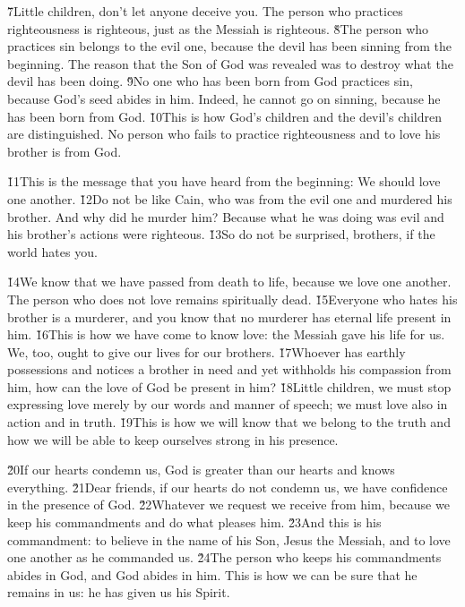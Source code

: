 \v{7}Little children, don't let anyone deceive you. The person who practices righteousness is righteous, just as the Messiah is righteous. \v{8}The person who practices sin belongs to the evil one, because the devil has been sinning from the beginning. The reason that the Son of God was revealed was to destroy what the devil has been doing. \v{9}No one who has been born from God practices sin, because God's seed abides in him. Indeed, he cannot go on sinning, because he has been born from God. \v{10}This is how God's children and the devil's children are distinguished. No person who fails to practice righteousness and to love his brother is from God.

\v{11}This is the message that you have heard from the beginning: We should love one another. \v{12}Do not be like Cain, who was from the evil one and murdered his brother. And why did he murder him? Because what he was doing was evil and his brother's actions were righteous. \v{13}So do not be surprised, brothers, if the world hates you.

\v{14}We know that we have passed from death to life, because we love one another. The person who does not love remains spiritually dead. \v{15}Everyone who hates his brother is a murderer, and you know that no murderer has eternal life present in him. \v{16}This is how we have come to know love: the Messiah gave his life for us. We, too, ought to give our lives for our brothers. \v{17}Whoever has earthly possessions and notices a brother in need and yet withholds his compassion from him, how can the love of God be present in him? \v{18}Little children, we must stop expressing love merely by our words and manner of speech; we must love also in action and in truth. \v{19}This is how we will know that we belong to the truth and how we will be able to keep ourselves strong in his presence.

\v{20}If our hearts condemn us, God is greater than our hearts and knows everything. \v{21}Dear friends, if our hearts do not condemn us, we have confidence in the presence of God. \v{22}Whatever we request we receive from him, because we keep his commandments and do what pleases him. \v{23}And this is his commandment: to believe in the name of his Son, Jesus the Messiah, and to love one another as he commanded us. \v{24}The person who keeps his commandments abides in God, and God abides in him. This is how we can be sure that he remains in us: he has given us his Spirit.

